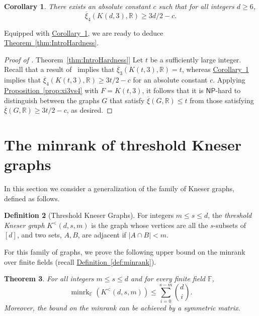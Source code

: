 \documentclass[11pt]{article}
\numberwithin{equation}{section}
\newtheorem{theorem}{Theorem}[section]
\newtheorem{corollary}[theorem]{Corollary}
\theoremstyle{definition}
\newtheorem{definition}[theorem]{Definition}
\theoremstyle{plain}
\newcommand{\R}{\mathbb R}
\newcommand{\expref}[2]{\hyperref[#2]{#1~\ref{#2}}}
\newcommand{\Fset}{\mathbb{F}}
\newcommand{\NP}{\mathsf{NP}}
\newcommand{\od}{\overline{\xi}}
\newcommand{\minrank}{\mathop{\mathrm{minrk}}}
\newcommand\Kneser[3]{K^<(#1,#2,#3)}
\begin{document}
\begin{corollary}\label{cor:3/2}
There exists an absolute constant $c$ such that for all integers $d \geq 6$,
\[\od_{4}(K(d,3),\R) \geq 3d/2-c.\]
\end{corollary}

Equipped with \expref{Corollary}{cor:3/2}, we are ready to deduce \expref{Theorem}{thm:IntroHardness}.

\begin{proof}[Proof of \expref{Theorem}{thm:IntroHardness}]
Let $t$ be a sufficiently large integer. Recall that a result of~\cite{BukhC18} implies that $\od_3(K(t,3),\R) = t$, whereas \expref{Corollary}{cor:3/2} implies that $\od_{4}(K(t,3),\R) \geq 3t/2-c$ for an absolute constant $c$.
Applying \expref{Proposition}{prop:xi3vs4} with $F = K(t,3)$, it follows that it is $\NP$-hard to 
%
%
distinguish between the graphs $G$ that satisfy $\od(G,\R) \leq t$ from those satisfying $\od(G,\R) \geq 3t/2-c$, as desired.
\end{proof}


%
\section{The minrank of threshold Kneser graphs}\label{sec:ODofGenKneser}

In this section we consider a generalization of the family of
Kneser graphs, defined as follows.  %

%
\begin{definition}[Threshold Kneser Graphs]\label{def:GenKneser}
%
  For integers $m \leq s \leq d$, the
%
\emph{threshold Kneser graph}   %
$\Kneser{d}{s}{m}$ is the graph whose vertices are all the $s$-subsets of $[d]$,
%
and   %
two sets, $A,B$, %
are adjacent if $|A \cap B| < m$.
\end{definition}

For this family of graphs, we prove the following upper bound on the minrank
%
%
over finite fields (recall \expref{Definition}{def:minrank}).

\begin{theorem}\label{thm:minrk_Kneser}
For all integers $m \leq s \leq d$ and for every finite field $\Fset$,
\[{\minrank}_{\Fset}(\Kneser{d}{s}{m}) \leq \sum_{i=0}^{s-m}\binom{d}{i}.\]
Moreover, the bound on the minrank can be achieved by a symmetric matrix.
\end{theorem}
\end{document}

